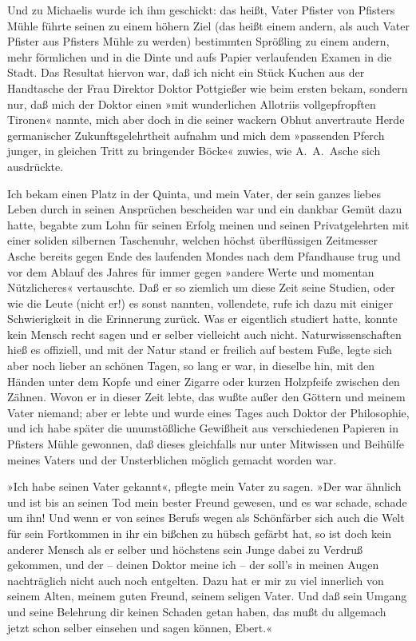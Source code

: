 Und zu Michaelis wurde ich ihm geschickt: das heißt, Vater Pfister
von Pfisters Mühle führte seinen zu einem höhern Ziel (das heißt
einem andern, als auch Vater Pfister aus Pfisters Mühle zu werden)
bestimmten Sprößling zu einem andern, mehr förmlichen und in die
Dinte und aufs Papier verlaufenden Examen in die Stadt. Das
Resultat hiervon war, daß ich nicht ein Stück Kuchen aus der
Handtasche der Frau Direktor Doktor Pottgießer wie beim ersten
bekam, sondern nur, daß mich der Doktor einen »mit wunderlichen
Allotriis vollgepfropften Tironen« nannte, mich aber doch in die
seiner wackern Obhut anvertraute Herde germanischer
Zukunftsgelehrtheit aufnahm und mich dem »passenden Pferch junger,
in gleichen Tritt zu bringender Böcke« zuwies, wie A.~A.~Asche sich
ausdrückte.

Ich bekam einen Platz in der Quinta, und mein Vater, der sein
ganzes liebes Leben durch in seinen Ansprüchen bescheiden war und
ein dankbar Gemüt dazu hatte, begabte zum Lohn für seinen Erfolg
meinen und seinen Privatgelehrten mit einer soliden silbernen
Taschenuhr, welchen höchst überflüssigen Zeitmesser Asche bereits
gegen Ende des laufenden Mondes nach dem Pfandhause trug und vor
dem Ablauf des Jahres für immer gegen »andere Werte und momentan
Nützlicheres« vertauschte. Daß er so ziemlich um diese Zeit seine
Studien, oder wie die Leute (nicht er!) es sonst nannten,
vollendete, rufe ich dazu mit einiger Schwierigkeit in die
Erinnerung zurück. Was er eigentlich studiert hatte, konnte kein
Mensch recht sagen und er selber vielleicht auch nicht.
Naturwissenschaften hieß es offiziell, und mit der Natur stand er
freilich auf bestem Fuße, legte sich aber noch lieber an schönen
Tagen, so lang er war, in dieselbe hin, mit den Händen unter dem
Kopfe und einer Zigarre oder kurzen Holzpfeife zwischen den Zähnen.
Wovon er in dieser Zeit lebte, das wußte außer den Göttern und
meinem Vater niemand; aber er lebte und wurde eines Tages auch
Doktor der Philosophie, und ich habe später die unumstößliche
Gewißheit aus verschiedenen Papieren in Pfisters Mühle gewonnen,
daß dieses gleichfalls nur unter Mitwissen und Beihülfe meines
Vaters und der Unsterblichen möglich gemacht worden war.

»Ich habe seinen Vater gekannt«, pflegte mein Vater zu sagen. »Der
war ähnlich und ist bis an seinen Tod mein bester Freund gewesen,
und es war schade, schade um ihn! Und wenn er von seines Berufs
wegen als Schönfärber sich auch die Welt für sein Fortkommen in ihr
ein bißchen zu hübsch gefärbt hat, so ist doch kein anderer Mensch
als er selber und höchstens sein Junge dabei zu Verdruß gekommen,
und der – deinen Doktor meine ich – der soll's in meinen Augen
nachträglich nicht auch noch entgelten. Dazu hat er mir zu viel
innerlich von seinem Alten, meinem guten Freund, seinem seligen
Vater. Und daß sein Umgang und seine Belehrung dir keinen Schaden
getan haben, das mußt du allgemach jetzt schon selber einsehen und
sagen können, Ebert.«


